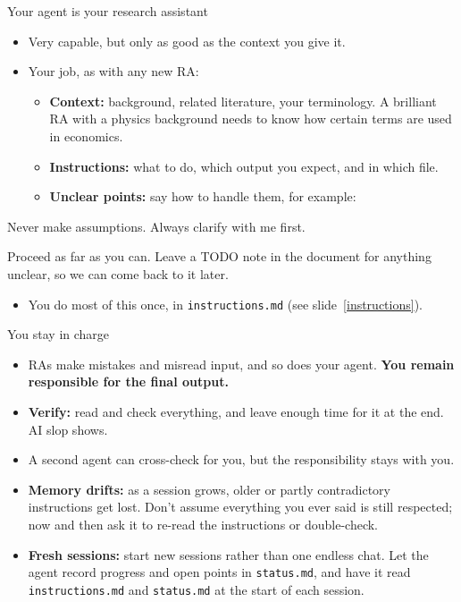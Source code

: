 \documentclass[aspectratio=169,11pt]{beamer}
\newcommand{\prompt}[1]{\begin{promptbox}\textcolor{accent}{\faCommentDots}\enspace #1\end{promptbox}}
\newcommand{\file}[1]{\texttt{#1}}
\begin{document}
\begin{frame}{Your agent is your research assistant}
  \label{ra}
  \begin{itemize}
    \item Very capable, but only as good as the context you give it.
    \item Your job, as with any new RA:
    \begin{itemize}
      \item \textbf{Context:} background, related literature, your terminology. A brilliant RA with a physics background needs to know how  certain terms are used in economics.
      \item \textbf{Instructions:} what to do, which output you expect, and in which file.
      \item \textbf{Unclear points:} say how to handle them, for example:
    \end{itemize}
  \end{itemize}
  \prompt{Never make assumptions. Always clarify with me first.}
  \prompt{Proceed as far as you can. Leave a TODO note in the document for anything unclear, so we can come back to it later.}
  \begin{itemize}
    \item You do most of this once, in \file{instructions.md} (see slide~\ref{instructions}).
  \end{itemize}
\end{frame}

\begin{frame}{You stay in charge}
  \label{charge}
  \begin{itemize}
    \item RAs make mistakes and misread input, and so does your agent. \textbf{You remain responsible for the final output.}
    \item \textbf{Verify:} read and check everything, and leave enough time for it at the end. AI slop shows.
    \item A second agent can cross-check for you, but the responsibility stays with you.
    \item \textbf{Memory drifts:} as a session grows, older or partly contradictory instructions get lost. Don't assume everything you ever said is still respected; now and then ask it to re-read the instructions or double-check.
    \item \textbf{Fresh sessions:} start new sessions rather than one endless chat. Let the agent record progress and open points in \file{status.md}, and have it read \file{instructions.md} and \file{status.md} at the start of each session.
  \end{itemize}
\end{frame}
\end{document}
